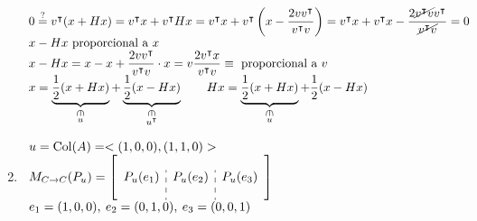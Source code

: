 \begin{enumerate}[label=\color{red}\textbf{\arabic*)}, leftmargin=*]
    $\begin{array}{l}
          0\overset{?}{=}v^\intercal(x+Hx)=v^\intercal x+v^\intercal Hx=v^\intercal x+v^\intercal\left(x-\dfrac{2vv^\intercal}{v^\intercal v}\right)=v^\intercal x+v^\intercal x-\dfrac{2\cancel{v^\intercal v}v^\intercal}{\cancel{v^\intercal v}}=0\\
          x-Hx\text{ proporcional a $x$}\\
          x-Hx=x-x+\dfrac{2vv^\intercal}{v^\intercal v}\cdot x=v\dfrac{2v^\intercal x}{v^\intercal v}\equiv\text{ proporcional a $v$}\\
          x=\underbrace{\dfrac{1}{2}(x+Hx)}_{\begin{subarray}{c}
                      \rotatebox{-90}{$\in$}\\
                      u
          \end{subarray}}+\underbrace{\dfrac{1}{2}(x-Hx)}_{\begin{subarray}{c}
          \rotatebox{-90}{$\in$}\\
          u^\intercal
    \end{subarray}}\qquad Hx=\underbrace{\dfrac{1}{2}(x+Hx)}_{\begin{subarray}{c}
    \rotatebox{-90}{$\in$}\\
    u
\end{subarray}}+\dfrac{1}{2}(x-Hx)
    \end{array}$
    
    \item {}
  
  $\begin{array}{l}
        u=\mathrm{Col}(A)=<(1,0,0),(1,1,0)>\\
        M_{C\to C}(P_u)=\left[\begin{array}{c:c:c}
         ~ & ~ & ~\\
         P_u(e_1) & P_u(e_2) & P_u(e_3)\\
          & & 
  \end{array}\right]\\
  e_1=(1,0,0),\:e_2=(0,1,0),\:e_3=(0,0,1)
  \end{array}$
  

\end{enumerate}
